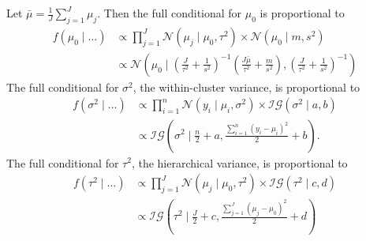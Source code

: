 \documentclass[12pt]{article}
\begin{document}
Let $\bar{\mu} = \frac{1}{J}\sum_{j = 1}^J\mu_j$.  Then the full conditional for $\mu_0$ is proportional to
\begin{equation*}
    \begin{aligned}
        f(\mu_0\mid\ldots) &\propto \prod_{j = 1}^J\mathcal{N}\left(\mu_j\mid\mu_0,\tau^2\right)\times \mathcal{N}\left(\mu_0\mid m, s^2\right)\\
        &\propto \mathcal{N}\left(\mu_0\mid \left(\frac{J}{\tau^2} + \frac{1}{s^2}\right)^{-1}\left(\frac{J\bar{\mu}}{\tau^2} + \frac{m}{s^2}\right), \left(\frac{J}{\tau^2} + \frac{1}{s^2}\right)^{-1}\right)
    \end{aligned}
\end{equation*}
The full conditional for $\sigma^2$, the within-cluster variance, is proportional to
\begin{equation*}
    \begin{aligned}
        f(\sigma^2\mid\ldots) &\propto \prod_{i = 1}^n\mathcal{N}\left(y_i\mid\mu_i,\sigma^2\right)\times\mathcal{IG}\left(\sigma^2\mid a, b\right)\\
        &\propto \mathcal{IG}\left(\sigma^2\mid \frac{n}{2} + a, \frac{\sum_{i = 1}^n (y_i - \mu_i)^2}{2} + b\right).
    \end{aligned}
\end{equation*}
The full conditional for $\tau^2$, the hierarchical variance, is proportional to
\begin{equation*}
    \begin{aligned}
        f(\tau^2\mid\ldots) &\propto \prod_{j = 1}^J\mathcal{N}\left(\mu_j\mid\mu_0,\tau^2\right)\times \mathcal{IG}\left(\tau^2\mid c,d\right)\\
        &\propto \mathcal{IG}\left(\tau^2\mid\frac{J}{2} + c, \frac{\sum_{j = 1}^J(\mu_j - \mu_0)^2}{2} + d\right)
    \end{aligned}
\end{equation*}
\end{document}
